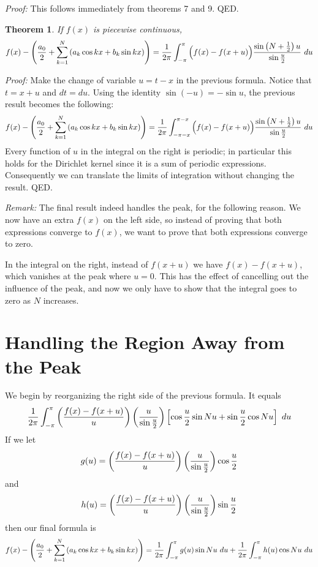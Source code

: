 \documentclass[11pt, oneside]{amsart}
\newtheorem{theorem}{Theorem}
\begin{document}
{\em Proof:} This follows immediately from theorems 7 and 9. QED.

\begin{theorem} If $f(x)$ is piecewise continuous,
$$f(x) - \left({{a_0} \over 2} + \sum_{k = 1}^N \left( a_k \cos kx + b_k \sin kx \right)\right) =  {1 \over {2 \pi}} \int_{- \pi}^\pi  \Big( f(x) - f(x + u)\Big) {{\sin \left(N + {1 \over 2}\right)u} \over {\sin {{u \over 2}}}} \ du$$
\end{theorem}

{\em Proof:} Make the change of variable $u = t - x$ in the previous formula. Notice that $t = x + u$ and $dt = du$. Using the identity $\sin(-u) = - \sin u$, the previous result becomes the following:
$$f(x) - \left({{a_0} \over 2} + \sum_{k = 1}^N \left( a_k \cos kx + b_k \sin kx \right)\right) =  {1 \over {2 \pi}} \int_{- \pi - x}^{\pi- x} \Big( f(x) - f(x + u)\Big) {{\sin \left(N + {1 \over 2}\right)u} \over {\sin {{u \over 2}}}} \ du$$
Every function of $u$ in the integral on the right is periodic; in particular this holds for the Dirichlet kernel since it is a sum of periodic expressions. Consequently we can translate the limits of integration without changing the result. QED.

{\em Remark:} The final result indeed handles the peak, for the following reason. We now have an extra $f(x)$ on the left side, so instead of proving that both expressions converge to $f(x)$, we want to prove that both expressions converge to zero. 

In the integral on the right, instead of $f(x + u)$ we have $f(x) - f(x + u)$,
which vanishes at the peak where $u = 0$. This has the effect of cancelling out the influence of the peak,
and now we only have to show that the integral goes to zero as $N$ increases.


\section{Handling the Region Away from the Peak}
 
We begin by reorganizing the right side of the previous formula. It equals
$$ {1 \over {2 \pi}} \int_{- \pi}^\pi \left( {{f(x) - f(x + u)} \over {u}}\right)  \left( {{u} \over {\sin {{u} \over 2}}} \right)
\left[\cos {u \over 2} \sin Nu + \sin {u \over 2} \cos Nu \right] \ du$$
If we let
$$g(u) = \left( {{f(x) - f(x + u)} \over {u}}\right)  \left( {{u} \over {\sin {{u} \over 2}}} \right) \cos {u \over 2}$$
and
$$h(u) = \left( {{f(x) - f(x + u)} \over {u}}\right)  \left( {{u} \over {\sin {{u} \over 2}}} \right) \sin {u \over 2}$$
then our final formula is
$$f(x) - \left({{a_0} \over 2} + \sum_{k = 1}^N \left( a_k \cos kx + b_k \sin kx \right)\right) = {1 \over {2 \pi}} \int_{- \pi}^\pi g(u) \sin Nu \ du +  {1 \over {2 \pi}} \int_{- \pi}^\pi h(u) \cos Nu \ du$$
\end{document}
